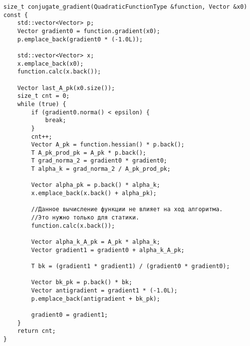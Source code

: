 \begin{lstlisting}
size_t conjugate_gradient(QuadraticFunctionType &function, Vector &x0) const {
    std::vector<Vector> p;
    Vector gradient0 = function.gradient(x0);
    p.emplace_back(gradient0 * (-1.0L));

    std::vector<Vector> x;
    x.emplace_back(x0);
    function.calc(x.back());

    Vector last_A_pk(x0.size());
    size_t cnt = 0;
    while (true) {
        if (gradient0.norma() < epsilon) {
            break;
        }
        cnt++;
        Vector A_pk = function.hessian() * p.back();
        T A_pk_prod_pk = A_pk * p.back();
        T grad_norma_2 = gradient0 * gradient0;
        T alpha_k = grad_norma_2 / A_pk_prod_pk;

        Vector alpha_pk = p.back() * alpha_k;
        x.emplace_back(x.back() + alpha_pk);

        //Данное вычисление функции не влияет на ход алгоритма.
        //Это нужно только для статики.
        function.calc(x.back());

        Vector alpha_k_A_pk = A_pk * alpha_k;
        Vector gradient1 = gradient0 + alpha_k_A_pk;

        T bk = (gradient1 * gradient1) / (gradient0 * gradient0);

        Vector bk_pk = p.back() * bk;
        Vector antigradient = gradient1 * (-1.0L);
        p.emplace_back(antigradient + bk_pk);

        gradient0 = gradient1;
    }
    return cnt;
}

\end{lstlisting}


